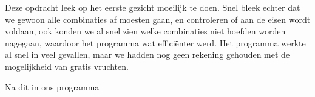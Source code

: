 Deze opdracht leek op het eerste gezicht moeilijk te doen. Snel bleek echter dat we gewoon alle combinaties af moesten gaan, en controleren of aan de eisen wordt voldaan, ook konden we al snel zien welke combinaties niet hoefden worden nagegaan, waardoor het programma wat effici\"enter werd. Het programma werkte al snel in veel gevallen, maar we hadden nog geen rekening gehouden met de mogelijkheid van gratis vruchten.

Na dit in ons programma 